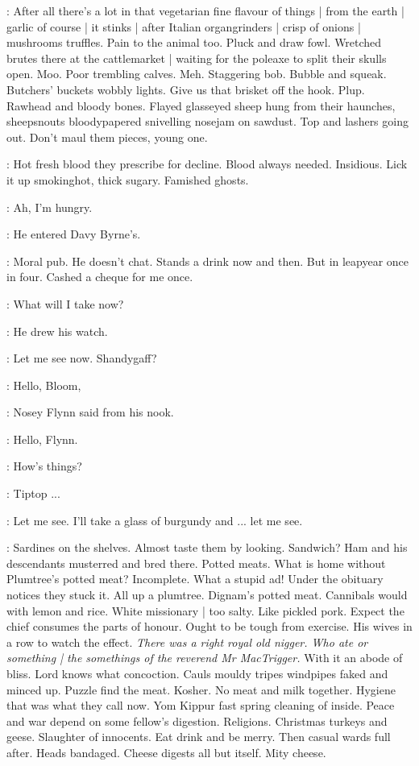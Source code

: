 \BloomInt:
After all there's a lot in that vegetarian fine flavour of things |
from the earth |
garlic of course |
it stinks |
after Italian organgrinders |
crisp of onions |
mushrooms truffles.
Pain to the animal too.
Pluck and draw fowl.
Wretched brutes there at the cattlemarket |
waiting for the poleaxe to split their skulls open.
Moo.
Poor trembling calves.
Meh.
Staggering bob.
Bubble and squeak.
Butchers' buckets wobbly lights.
Give us that brisket off the hook.
Plup.
Rawhead and bloody bones.
Flayed glasseyed sheep hung from their haunches,
sheepsnouts bloodypapered snivelling nosejam on sawdust.
Top and lashers going out.
Don't maul them pieces, young one.

\BloomInt:
Hot fresh blood they prescribe for decline.
Blood always needed.
Insidious.
Lick it up smokinghot, thick sugary.
Famished ghosts.

\BloomInt:
Ah, I'm hungry.

:
He entered Davy Byrne's.

\BloomInt:
Moral pub.
He doesn't chat.
Stands a drink now and then.
But in leapyear once in four.
Cashed a cheque for me once.

\BloomInt:
What will I take now?

:
He drew his watch.

\BloomInt:
Let me see now.
Shandygaff?

\nosey:
Hello, Bloom,

:
Nosey Flynn said from his nook.

\Bloom:
Hello,
Flynn.

\nosey:
How's things?

\Bloom:
Tiptop ...

\BloomInt:
Let me see.
I'll take a glass of burgundy and ...
let me see.

\BloomInt:
Sardines on the shelves.
Almost taste them by looking.
Sandwich?
Ham and his descendants musterred and bred there.
Potted meats.
What is home without Plumtree's potted meat?
Incomplete.
What a stupid ad!
Under the obituary notices they stuck it.
All up a plumtree.
Dignam's potted meat.
Cannibals would with lemon and rice.
White missionary |
too salty.
Like pickled pork.
Expect the chief consumes the parts of honour.
Ought to be tough from exercise.
His wives in a row to watch the effect.
\emph{There was a right royal old nigger.
Who ate or something |
the somethings of the reverend Mr MacTrigger.}
With it an abode of bliss.
Lord knows what concoction.
Cauls mouldy tripes windpipes faked and minced up.
Puzzle find the meat.
Kosher.
No meat and milk together.
Hygiene that was what they call now.
Yom Kippur fast spring cleaning of inside.
Peace and war depend on some fellow's digestion.
Religions.
Christmas turkeys and geese.
Slaughter of innocents.
Eat drink and be merry.
Then casual wards full after.
Heads bandaged.
Cheese digests all but itself.
Mity cheese.

